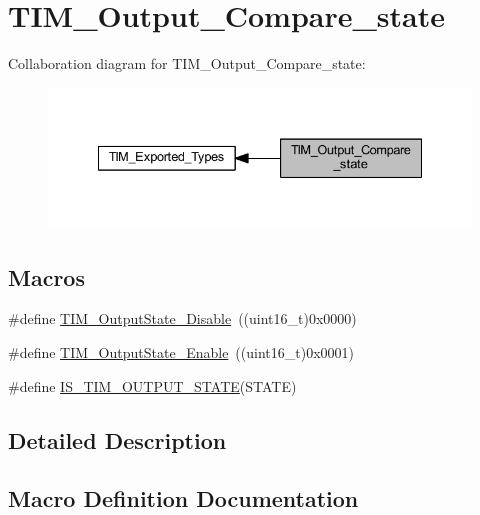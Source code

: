 \hypertarget{group___t_i_m___output___compare__state}{}\section{T\+I\+M\+\_\+\+Output\+\_\+\+Compare\+\_\+state}
\label{group___t_i_m___output___compare__state}
Collaboration diagram for T\+I\+M\+\_\+\+Output\+\_\+\+Compare\+\_\+state\+:
\nopagebreak
\begin{figure}[H]
\begin{center}
\leavevmode
\includegraphics[width=335pt]{group___t_i_m___output___compare__state}
\end{center}
\end{figure}
\subsection*{Macros}
\begin{DoxyCompactItemize}
\item 
\#define \hyperlink{group___t_i_m___output___compare__state_ga4ad0f484cfa16b5190654da8278940d0}{T\+I\+M\+\_\+\+Output\+State\+\_\+\+Disable}~((uint16\+\_\+t)0x0000)
\item 
\#define \hyperlink{group___t_i_m___output___compare__state_ga65afdda8761b6ac5ed0c0ad67c05dffe}{T\+I\+M\+\_\+\+Output\+State\+\_\+\+Enable}~((uint16\+\_\+t)0x0001)
\item 
\#define \hyperlink{group___t_i_m___output___compare__state_ga5848617f830d2de688eaff50ed279679}{I\+S\+\_\+\+T\+I\+M\+\_\+\+O\+U\+T\+P\+U\+T\+\_\+\+S\+T\+A\+TE}(S\+T\+A\+TE)
\end{DoxyCompactItemize}


\subsection{Detailed Description}


\subsection{Macro Definition Documentation}
\mbox{\label{group___t_i_m___output___compare__state_ga5848617f830d2de688eaff50ed279679}} 
